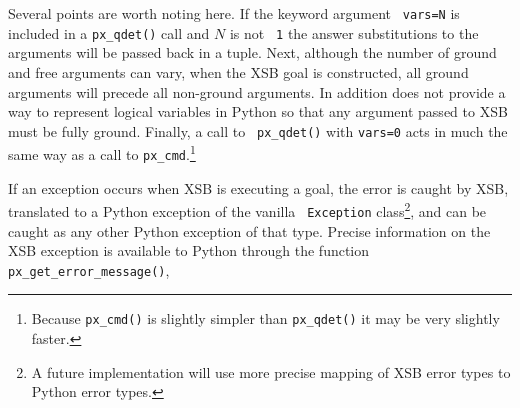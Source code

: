 \begin{example}
Several points are worth noting here.  If the keyword argument {\tt
  vars=N} is included in a {\tt px\_qdet()} call and $N$ is not {\tt
  1} the answer substitutions to the arguments will be passed back in
a tuple.  Next, although the number of ground and free arguments can
vary, when the XSB goal is constructed, all ground arguments will
precede all non-ground arguments.  In addition \px{} does not provide
a way to represent logical variables in Python so that any argument
passed to XSB must be fully ground.  Finally, a call to {\tt
  px\_qdet()} with {\tt vars=0} acts in much the same way as a call to
{\tt px\_cmd}.\footnote{Because {\tt px\_cmd()} is slightly simpler
  than {\tt px\_qdet()} it may be very slightly faster.}
\end{example}

If an exception occurs when XSB is executing a goal, the error is
caught by XSB, translated to a Python exception of the vanilla {\tt
  Exception} class\footnote{A future implementation will use more
  precise mapping of XSB error types to Python error types.}, and can
be caught as any other Python exception of that type.  Precise
information on the XSB exception is available to Python through the
\px{} function {\tt px\_get\_error\_message()},

